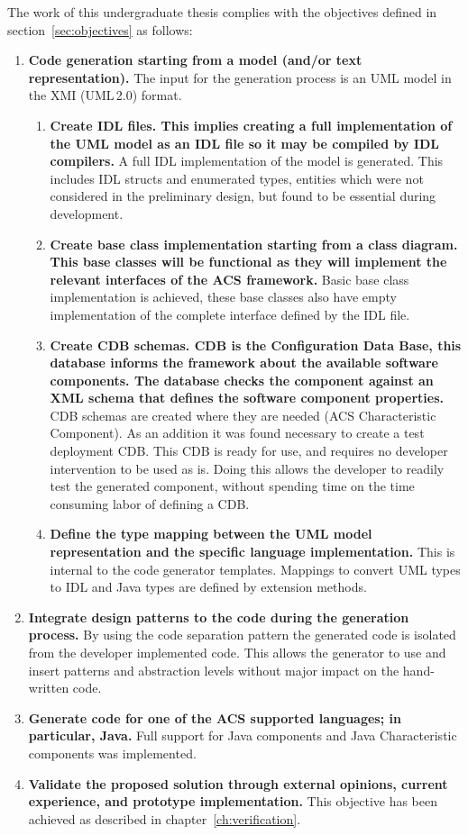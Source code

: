 The work of this undergraduate thesis complies
with the objectives defined in
section~\ref{sec:objectives} as follows:
\begin{enumerate}
\item
  \textbf{Code generation starting from a model
  (and/or text representation).}
  The input for the generation process is an UML model in the
  XMI (UML\,2.0) format.
  \begin{enumerate}
     \item \textbf{Create IDL files. This implies creating a full implementation of the
     UML model as an IDL file so it may be compiled by IDL compilers.}
     A full IDL implementation of the model is generated.
     This includes IDL structs and enumerated types, entities which were not
     considered in the preliminary design, but found to be essential during development.
     \item \textbf{Create base class implementation starting from a class diagram.
     This base classes will be functional as they will implement the
     relevant interfaces of the ACS framework.}
     Basic base class implementation is achieved, these base classes
     also have empty implementation of the complete interface defined by the IDL file.
     \item \textbf{Create CDB schemas. CDB is the Configuration Data Base, this database informs
     the framework about the available software components.
     The database checks the component against an XML schema that defines the software
     component properties.}
     CDB schemas are created where they are needed (ACS Characteristic Component).
     As an addition it was found necessary to create a test deployment CDB.
     This CDB is ready for use, and requires no developer intervention to be used as is.
     Doing this allows the developer to readily test the generated component,
     without spending time on the time consuming labor of defining a CDB.
     \item \textbf{Define the type mapping between the UML model representation
     and the specific language implementation.}
     This is internal to the code generator templates.
     Mappings to convert UML types to IDL and Java types
     are defined by extension methods.
  \end{enumerate}
\item
  \textbf{Integrate design patterns to the code during the generation process.}
  By using the code separation pattern the generated code is isolated from
  the developer implemented code. This allows the generator to use and insert
  patterns and abstraction levels without major impact on the hand-written code.
\item
  \textbf{Generate code for one of the ACS supported languages;
  in particular, Java.}
  Full support for Java components and Java Characteristic components was implemented.
\item
  \textbf{Validate the proposed solution through external opinions,
  current experience,
  and prototype implementation.}
  This objective has been achieved as described in chapter~\ref{ch:verification}.
\end{enumerate}

